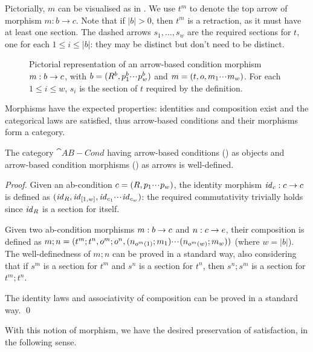 Pictorially, $m$ can be visualised as in . We use $t^m$ to denote the top arrow of morphism $m:b\to c$. Note that if $|b|>0$, then $t^m$ is a retraction, as it must have at least one section.  The dashed arrows $s_1, \ldots, s_w$ are the required sections for $t$, one for each $1\leq i\leq |b|$: they may be distinct but don't need to be distinct.  
%
\begin{figure}
  \centering
  
  \caption{Pictorial representation of an arrow-based condition morphism $m:b\rightarrow c$, with $b=(R^b,p^b_1{\cdotp\mkern-2mu\cdotp\mkern-2mu\cdotp\mkern1mu} p^b_w)$ and $m = (t,o,m_1{\cdotp\mkern-2mu\cdotp\mkern-2mu\cdotp\mkern1mu} m_w)$. For each $1 \leq i \leq w$, $s_i$ is the section of $t$ required by the definition.}
\end{figure}

\medskip\noindent Morphisms have the expected properties: identities and composition exist and the categorical laws are satisfied, thus arrow-based conditions and their morphisms form a category.
%

\begin{proposition}
  The category $\cat{AB-Cond}$ having arrow-based conditions () as objects and arrow-based condition morphisms () as arrows is well-defined.
\end{proposition}
 
\begin{proof}
  Given an ab-condition $c=(R,p_1{\cdotp\mkern-2mu\cdotp\mkern-2mu\cdotp\mkern1mu} p_w)$, the identity morphism $\mathit{id}_c:c\rightarrow c$ is defined as $(\mathit{id}_R,\mathit{id}_{[1,w]},\mathit{id}_{c_1}{\cdotp\mkern-2mu\cdotp\mkern-2mu\cdotp\mkern1mu}\mathit{id}_{c_w})$: the required commutativity trivially holds since $\mathit{id}_R$ is a section for itself.
  
Given two ab-condition morphisms $m:b\rightarrow c$ and $n:c\rightarrow e$, their composition is defined as $m;n=(t^m;t^n,o^m;o^n,(n_{o^m(1)};m_1){\cdotp\mkern-2mu\cdotp\mkern-2mu\cdotp\mkern1mu} (n_{o^m(w)};m_{w}))$ (where $w=|b|$). The well-definedness of $m;n$ can be proved in a standard way, also considering that if $s^m$ is a section for $t^m$ and $s^n$ is a section for $t^n$, then $s^n;s^m$ is a section for $t^m;t^n$.

The identity laws and associativity of composition can be proved in a standard way. \qed
\end{proof}
%
With this notion of morphism, we have the desired preservation of satisfaction, in the following sense.

